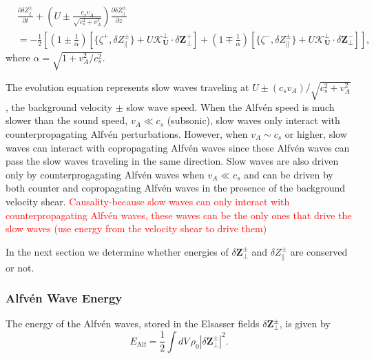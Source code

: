 \begin{equation}
    \label{eq:RMHD Elsasser-like}
    \begin{split}
    &\frac{\partial \delta Z_{\parallel}^{\pm}}{\partial t} +\left(U\pm \frac{c_{s} v_{A}}{\sqrt{c_{s}^{2} + v_{A}^{2}}} \right) \frac{\partial \delta Z_{\parallel}^{\pm}}{\partial z} \\
    &= -\frac{1}{2} \left[ \left( 1 \pm \frac{1}{\alpha} \right) [\{ \zeta^{+}, \delta Z_{\parallel}^{\pm} \}+U  \boldsymbol{\mathcal{K}^{\perp}_{U}} \cdot \delta \boldsymbol{Z^{+}_{\perp}}] + \left( 1 \mp \frac{1}{\alpha} \right) [\{ \zeta^{-}, \delta Z_{\parallel}^{\pm} \}+ U  \boldsymbol{\mathcal{K}^{\perp}_{U}} \cdot \delta \boldsymbol{Z^{-}_{\perp}}] \right],
    \end{split}
\end{equation}
where \(\alpha= \sqrt{1 + v_{A}^{2} / c_{s}^{2}}\).

The evolution equation represents slow waves traveling at \(U\pm (c_{s} v_{A})/\sqrt{c_{s}^{2} + v_{A}^{2}}\), the background velocity \(\pm\) slow wave speed. When the Alfv\'en speed is much slower than the sound speed, \(v_A \ll c_s\) (subsonic), slow waves only interact with counterpropagating Alfv\'en perturbations. However, when \(v_A \sim c_s\) or higher, slow waves can interact with copropagating Alfv\'en waves since these Alfv\'en waves can pass the slow waves traveling in the same direction. Slow waves are also driven only by counterprogagating Alfv\'en waves when \(v_A \ll c_s\) and can be driven by both counter and copropagating Alfv\'en waves in the presence of the background velocity shear. \textcolor{red}{Causality-because slow waves can only interact with counterpropagating Alfv\'en waves, these waves can be the only ones that drive the slow waves (use energy from the velocity shear to drive them)}


In the next section we determine whether energies of \(\delta \boldsymbol{Z}_{\perp}^{\pm}\) and \(\delta Z_{\parallel}^{\pm}\) are conserved or not.

\subsubsection{Alfv\'en Wave Energy}
The energy of the Alfv\'en waves, stored in the Elsasser fields \(\delta\boldsymbol{Z}_{\perp}^{\pm}\), is given by
\begin{equation*}
    E_{\mathrm{Alf}} = \frac{1}{2} \int dV\, \rho_{0} \left| \delta\boldsymbol{Z}_{\perp}^{\pm} \right|^{2}.
\end{equation*}

